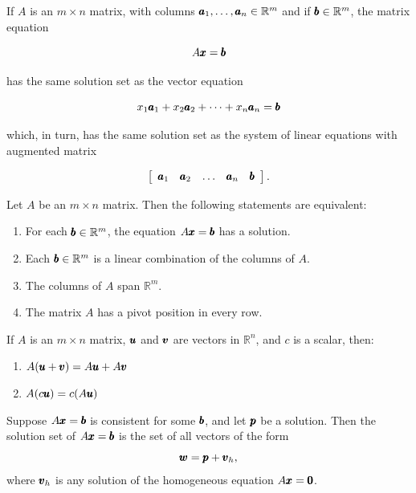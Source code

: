 \begin{theorem}
    If $A$ is an $m \times n$ matrix, with columns $\pmb{a}_1, \ldots, \pmb{a}_n \in \mathbb{R}^m$ and if $\pmb{b} \in \mathbb{R}^m$, the matrix equation

\[
A \pmb{x} = \pmb{b}
\]

has the same solution set as the vector equation

\[
x_1 \pmb{a}_1 + x_2 \pmb{a}_2 + \cdots + x_n \pmb{a}_n = \pmb{b}
\]

which, in turn, has the same solution set as the system of linear equations with augmented matrix

\[
\left[\begin{array}{lllll}
\pmb{a}_1 & \pmb{a}_2 & \ldots & \pmb{a}_n & \pmb{b}
\end{array}\right].
\]

\end{theorem}

\begin{theorem}
Let \( A \) be an \( m \times n \) matrix. Then the following statements are equivalent:
\begin{enumerate}[label=(\alph*)]
    \item For each \( \pmb{b} \in \mathbb{R}^m \), the equation \( A \pmb{x} = \pmb{b} \) has a solution.
    \item Each \( \pmb{b} \in \mathbb{R}^m \) is a linear combination of the columns of \( A \).
    \item The columns of \( A \) span \( \mathbb{R}^m \).
    \item The matrix \( A \) has a pivot position in every row.
\end{enumerate}
\end{theorem}

\begin{theorem}
If \( A \) is an \( m \times n \) matrix, \( \pmb{u} \) and \( \pmb{v} \) are vectors in \( \mathbb{R}^n \), and \( c \) is a scalar, then:

\begin{enumerate}[label=(\alph*)]
    \item \( A(\pmb{u} + \pmb{v}) = A \pmb{u} + A \pmb{v} \)  


    \item \( A(c \pmb{u}) = c(A \pmb{u}) \)  

\end{enumerate}
\end{theorem}

\begin{theorem}
    Suppose $A \pmb{x} = \pmb{b}$ is consistent for some $\pmb{b}$, and let $\pmb{p}$ be a solution. Then the solution set of $A \pmb{x} = \pmb{b}$ is the set of all vectors of the form
    \[
    \pmb{w} = \pmb{p} + \pmb{v}_h,
    \]
    where $\pmb{v}_h$ is any solution of the homogeneous equation $A \pmb{x} = \pmb{0}$.
\end{theorem}

